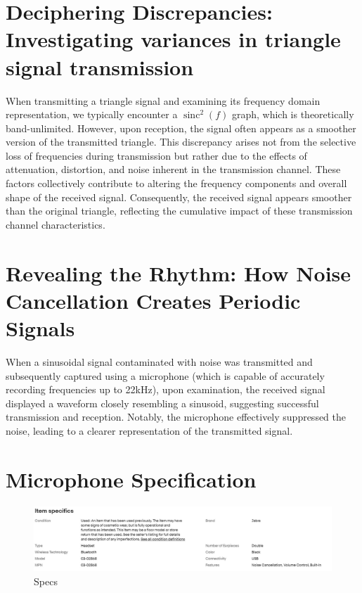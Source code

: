 \documentclass{report}
\DeclareMathOperator{\sinc}{sinc}
\begin{document}
\section{Deciphering Discrepancies: Investigating variances in triangle signal transmission}
When transmitting a triangle signal and examining its frequency domain representation, we typically encounter a  $ \sinc^2(f) $ 
graph, which is theoretically band-unlimited. However, upon reception, the signal often appears as a smoother version of the transmitted triangle. This discrepancy arises not from the selective loss of frequencies during transmission but rather due to the effects of attenuation, distortion, and noise inherent in the transmission channel. These factors collectively contribute to altering the frequency components and overall shape of the received signal. Consequently, the received signal appears smoother than the original triangle, reflecting the cumulative impact of these transmission channel characteristics.

\section{Revealing the Rhythm: How Noise Cancellation Creates Periodic Signals}
When a sinusoidal signal contaminated with noise was transmitted and subsequently captured using a microphone (which is capable of accurately recording frequencies up to 22kHz), upon examination, the received signal displayed a waveform closely resembling a sinusoid, suggesting successful transmission and reception. Notably, the microphone effectively suppressed the noise, leading to a clearer representation of the transmitted signal.


\section{Microphone Specification}

\begin{figure}[h]
    \centering
    \includegraphics[width=1\linewidth]{mic_spec.png}
    \caption{Specs}
    \label{fig:enter-label}
\end{figure}
\end{document}
